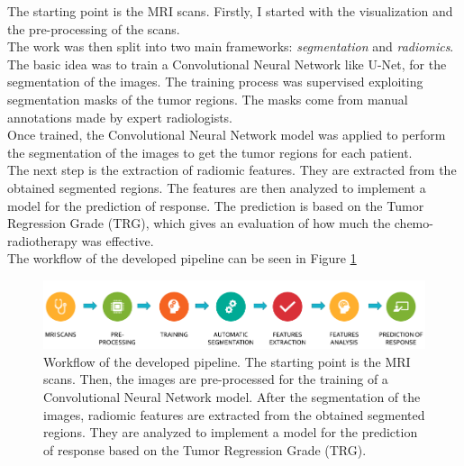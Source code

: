 \documentclass{standalone}
\begin{document}
The starting point is the MRI scans. 
Firstly, I started with the visualization and the pre-processing of the scans.
\\
The work was then split into two main frameworks: \textit{segmentation} and \textit{radiomics}.
The basic idea was to train a Convolutional Neural Network like U-Net, for the segmentation of the images.
The training process was supervised exploiting segmentation masks of the tumor regions.
The masks come from manual annotations made by expert radiologists.
\\
Once trained, the Convolutional Neural Network model was applied to perform the segmentation of the images to get the tumor regions for each patient.
\\
The next step is the extraction of radiomic features.
They are extracted from the obtained segmented regions.
The features are then analyzed to implement a model for the prediction of response.
The prediction is based on the Tumor Regression Grade (TRG), which gives an evaluation of how much the chemo-radiotherapy was effective.
\\
The workflow of the developed pipeline can be seen in Figure \ref{workflow}
\begin{figure}[htp]

    \centering
    \includegraphics[width=\textwidth]{../images/finalworkflow.png}
    
    \caption{Workflow of the developed pipeline. The starting point is the MRI scans. Then, the images are pre-processed for the training of a Convolutional Neural Network model. After the segmentation of the images, radiomic features are extracted from the obtained segmented regions. They are analyzed to implement a model for the prediction of response based on the Tumor Regression Grade (TRG).}
    \label{workflow}
    
    \end{figure}
\end{document}
